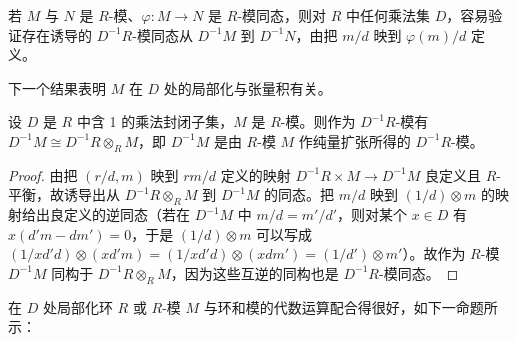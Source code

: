 若 \(M\) 与 \(N\) 是 \(R\)-模、\(\varphi : M \to N\) 是 \(R\)-模同态，则对 \(R\) 中任何乘法集 \(D\)，容易验证存在诱导的 \(D^{-1}R\)-模同态从 \(D^{-1}M\) 到 \(D^{-1}N\)，由把 \(m/d\) 映到 \(\varphi(m)/d\) 定义。

下一个结果表明 \(M\) 在 \(D\) 处的局部化与张量积有关。

\begin{proposition}\label{pro:15.41}
设 \(D\) 是 \(R\) 中含 1 的乘法封闭子集，\(M\) 是 \(R\)-模。则作为 \(D^{-1}R\)-模有 \(D^{-1}M \cong D^{-1}R \otimes_RM\)，即 \(D^{-1}M\) 是由 \(R\)-模 \(M\) 作纯量扩张所得的 \(D^{-1}R\)-模。
\end{proposition}

\begin{proof}
由把 \((r/d, m)\) 映到 \(rm/d\) 定义的映射 \(D^{-1}R \times M \to D^{-1}M\) 良定义且 \(R\)-平衡，故诱导出从 \(D^{-1}R \otimes_RM\) 到 \(D^{-1}M\) 的同态。把 \(m/d\) 映到 \((1/d)\otimes m\) 的映射给出良定义的逆同态（若在 \(D^{-1}M\) 中 \(m/d = m'/d'\)，则对某个 \(x \in D\) 有 \(x(d'm-dm') = 0\)，于是 \((1/d)\otimes m\) 可以写成 \((1/xd'd)\otimes(xd'm) = (1/xd'd)\otimes(xdm') = (1/d')\otimes m'\)）。故作为 \(R\)-模 \(D^{-1}M\) 同构于 \(D^{-1}R \otimes_RM\)，因为这些互逆的同构也是 \(D^{-1}R\)-模同态。
\end{proof}

在 \(D\) 处局部化环 \(R\) 或 \(R\)-模 \(M\) 与环和模的代数运算配合得很好，如下一命题所示：

